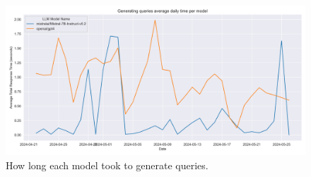 \begin{figure}[H]
    \centering
    \includegraphics[width=\textwidth]{results/plots/assets/performance-06-generating-queries.png}
    \caption{How long each model took to generate queries.}
    \label{fig:performance_06_generating_queries}
\end{figure}